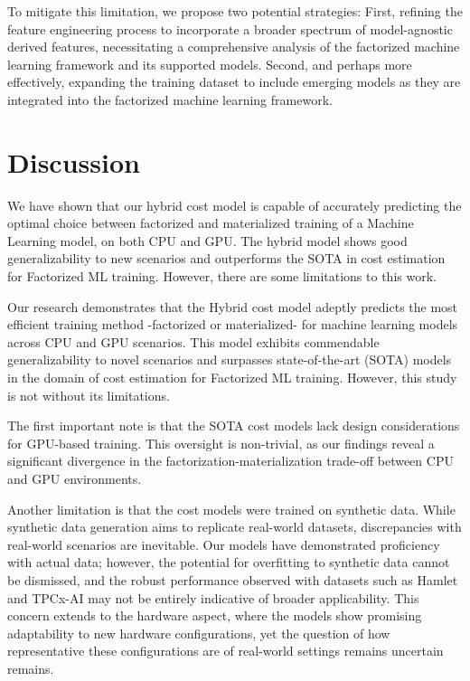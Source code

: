 To mitigate this limitation, we propose two potential strategies: First, refining the feature engineering process to incorporate a broader spectrum of model-agnostic derived features, necessitating a comprehensive analysis of the factorized machine learning framework and its supported models. Second, and perhaps more effectively, expanding the training dataset to include emerging models as they are integrated into the factorized machine learning framework.

\section{Discussion}
\label{sec:eval-discussion}
We have shown that our hybrid cost model is capable of accurately predicting the optimal choice between factorized and materialized training of a Machine Learning model, on both CPU and GPU. The hybrid model shows good generalizability to new scenarios and outperforms the SOTA in cost estimation for Factorized ML training. However, there are some limitations to this work.

Our research demonstrates that the Hybrid cost model adeptly predicts the most efficient training method -factorized or materialized- for machine learning models across CPU and GPU scenarios. This model exhibits commendable generalizability to novel scenarios and surpasses state-of-the-art (SOTA) models in the domain of cost estimation for Factorized ML training. However, this study is not without its limitations.

The first important note is that the SOTA cost models lack design considerations for GPU-based training. This oversight is non-trivial, as our findings reveal a significant divergence in the factorization-materialization trade-off between CPU and GPU environments.

Another limitation is that the cost models were trained on synthetic data. While synthetic data generation aims to replicate real-world datasets, discrepancies with real-world scenarios are inevitable.  Our models have demonstrated proficiency with actual data; however, the potential for overfitting to synthetic data cannot be dismissed, and the robust performance observed with datasets such as Hamlet and TPCx-AI may not be entirely indicative of broader applicability. This concern extends to the hardware aspect, where the models show promising adaptability to new hardware configurations, yet the question of how representative these configurations are of real-world settings remains uncertain remains.

